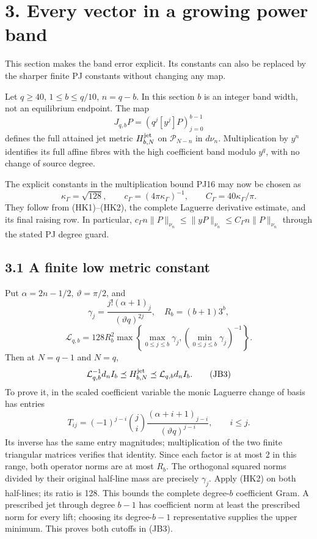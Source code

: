 \documentclass[10pt]{article}
\begin{document}
\section{3. Every vector in a growing power band}\label{every-vector-in-a-growing-power-band}

This section makes the band error explicit. Its constants can also be replaced by the sharper finite PJ constants without changing any map.

Let \(q\ge40\), \(1\le b\le q/10\), \(n=q-b\). In this section \(b\) is an integer band width, not an equilibrium endpoint. The map \[
 J_{q,b}P=(q^j[y^j]P)_{j=0}^{b-1}
\] defines the full attained jet metric \(H^{\rm jet}_{b,N}\) on \(\mathcal P_{N-n}\) in \(d\nu_n\). Multiplication by \(y^n\) identifies its full affine fibres with the high coefficient band modulo \(y^q\), with no change of source degree.

The explicit constants in the multiplication bound PJ16 may now be chosen as \[
 \kappa_\Gamma=\sqrt{128},\qquad
 c_\Gamma=(4\pi\kappa_\Gamma)^{-1},\qquad
 C_\Gamma=40\kappa_\Gamma/\pi.
 \tag{JB1}
\] They follow from (HK1)--(HK2), the complete Laguerre derivative estimate, and its final raising row. In particular, \(c_\Gamma n\|P\|_{\nu_n}\le\|yP\|_{\nu_n}\le C_\Gamma n\|P\|_{\nu_n}\) through the stated PJ degree guard.

\subsection{3.1 A finite low metric constant}\label{a-finite-low-metric-constant}

Put \(\alpha=2n-1/2\), \(\vartheta=\pi/2\), and \[
 \gamma_j=\frac{j!(\alpha+1)_j}{(\vartheta q)^{2j}},\quad
 R_b=(b+1)3^b,
\] \[
 \mathcal L_{q,b}=128R_b^2
 \max\left\{\max_{0\le j\le b}\gamma_j,
 (\min_{0\le j\le b}\gamma_j)^{-1}\right\}.
 \tag{JB2}
\] Then at \(N=q-1\) and \(N=q\), \[
 \mathcal L_{q,b}^{-1}d_n I_b
 \preceq H^{\rm jet}_{b,N}
 \preceq\mathcal L_{q,b}d_n I_b.
 \tag{JB3}
\] To prove it, in the scaled coefficient variable the monic Laguerre change of basis has entries \[
 T_{ij}=(-1)^{j-i}\binom ji
 \frac{(\alpha+i+1)_{j-i}}{(\vartheta q)^{j-i}},\qquad i\le j.
\] Its inverse has the same entry magnitudes; multiplication of the two finite triangular matrices verifies that identity. Since each factor is at most 2 in this range, both operator norms are at most \(R_b\). The orthogonal squared norms divided by their original half-line mass are precisely \(\gamma_j\). Apply (HK2) on both half-lines; its ratio is 128. This bounds the complete degree-\(b\) coefficient Gram. A prescribed jet through degree \(b-1\) has coefficient norm at least the prescribed norm for every lift; choosing its degree-\(b-1\) representative supplies the upper minimum. This proves both cutoffs in (JB3).
\end{document}
